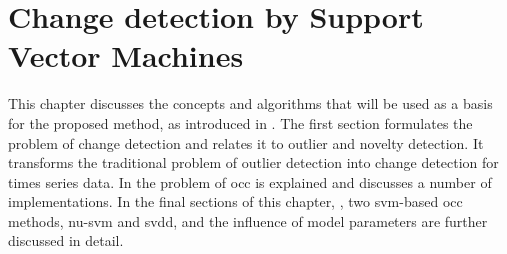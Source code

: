 
\chapter{Change detection by Support Vector Machines}

\label{Chapter3} %


This chapter discusses the concepts and algorithms that will be used as a basis for the proposed method, as introduced in .
The first section formulates the problem of change detection and relates it to outlier and novelty detection.
It transforms the traditional problem of outlier detection into change detection for times series data.
In  the problem of \acrlong{occ} is explained and discusses a number of implementations.
In the final sections of this chapter, , two \gls{svm}-based \gls{occ} methods, \gls{nu-svm} and \gls{svdd}, and the influence of model parameters are further discussed in detail.




